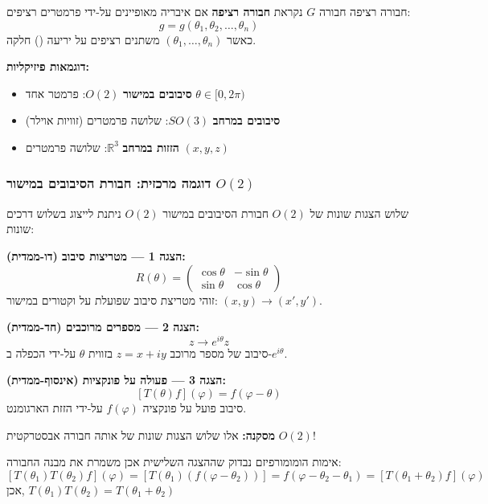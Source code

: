 \begin{definitionbox}{חבורה רציפה}
חבורה $G$ נקראת \textbf{חבורה רציפה} אם איבריה מאופיינים על-ידי פרמטרים רציפים:
\[
g = g(\theta_1, \theta_2, \ldots, \theta_n)
\]
כאשר $(\theta_1, \ldots, \theta_n)$ משתנים רציפים על יריעה () חלקה.

\textbf{דוגמאות פיזיקליות:}
\begin{itemize}
    \item \textbf{סיבובים במישור} $O(2)$: פרמטר אחד $\theta \in [0, 2\pi)$
    \item \textbf{סיבובים במרחב} $SO(3)$: שלושה פרמטרים (זוויות אוילר)
    \item \textbf{הזזות במרחב} $\mathbb{R}^3$: שלושה פרמטרים $(x, y, z)$
\end{itemize}
\end{definitionbox}

\subsubsection{דוגמה מרכזית: חבורת הסיבובים במישור $O(2)$}

\begin{examplebox}{שלוש הצגות שונות של $O(2)$}
חבורת הסיבובים במישור $O(2)$ ניתנת לייצוג בשלוש דרכים שונות:

\textbf{הצגה 1 — מטריצות סיבוב (דו-ממדית):}
\[
R(\theta) = \begin{pmatrix}
\cos\theta & -\sin\theta \\
\sin\theta & \cos\theta
\end{pmatrix}
\]
זוהי מטריצת סיבוב שפועלת על וקטורים במישור: $(x, y) \to (x', y')$.

\textbf{הצגה 2 — מספרים מרוכבים (חד-ממדית):}
\[
z \to e^{i\theta} z
\]
סיבוב של מספר מרוכב $z = x + iy$ בזווית $\theta$ על-ידי הכפלה ב-$e^{i\theta}$.

\textbf{הצגה 3 — פעולה על פונקציות (אינסוף-ממדית):}
\[
[T(\theta) f](\varphi) = f(\varphi - \theta)
\]
סיבוב פועל על פונקציה $f(\varphi)$ על-ידי הזזת הארגומנט.

\textbf{מסקנה:} אלו שלוש הצגות שונות של אותה חבורה אבסטרקטית $O(2)$!
\end{examplebox}

\begin{notebox}{אימות הומומורפיזם}
נבדוק שההצגה השלישית אכן משמרת את מבנה החבורה:
\[
[T(\theta_1) T(\theta_2) f](\varphi) = [T(\theta_1)(f(\varphi - \theta_2))] = f(\varphi - \theta_2 - \theta_1) = [T(\theta_1 + \theta_2) f](\varphi)
\]
אכן, $T(\theta_1) T(\theta_2) = T(\theta_1 + \theta_2)$ 
\end{notebox}

